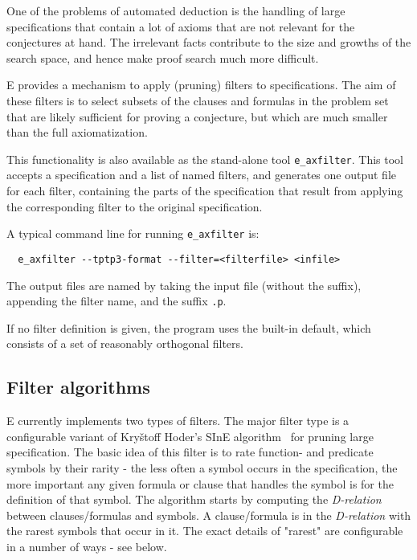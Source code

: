\documentclass{report}
\begin{document}
One of the problems of automated deduction is the handling of large
specifications that contain a lot of axioms that are not relevant for
the conjectures at hand. The irrelevant facts contribute to the size
and growths of the search space, and hence make proof search much more
difficult.

E provides a mechanism to apply (pruning) filters to
specifications. The aim of these filters is to select subsets of the
clauses and formulas in the problem set that are likely sufficient for
proving a conjecture, but which are much smaller than the full
axiomatization.

This functionality is also available as the stand-alone tool
\texttt{e\_axfilter}. This tool accepts a specification and a list of
named filters, and generates one output file for each filter,
containing the parts of the specification that result from applying
the corresponding filter to the original specification.

A typical command line for running \texttt{e\_axfilter} is:

\begin{verbatim}
  e_axfilter --tptp3-format --filter=<filterfile> <infile>
\end{verbatim}

The output files are named by taking the input file (without the
suffix), appending the filter name, and the suffix \texttt{.p}.

If no filter definition is given, the program uses the built-in
default, which consists of a set of reasonably orthogonal filters.



\subsection{Filter algorithms}

E currently implements two types of filters. The major filter type is
a configurable variant of Kry\v{s}toff Hoder's SInE
algorithm~\cite{HV:CADE-2011} for pruning large specification. The
basic idea of this filter is to rate function- and predicate symbols
by their rarity - the less often a symbol occurs in the specification,
the more important any given formula or clause that handles the symbol
is for the definition of that symbol. The algorithm starts by
computing the \emph{D-relation} between clauses/formulas and
symbols. A clause/formula is in the \emph{D-relation} with the rarest
symbols that occur in it. The exact details of "rarest" are
configurable in a number of ways - see below.
\end{document}
